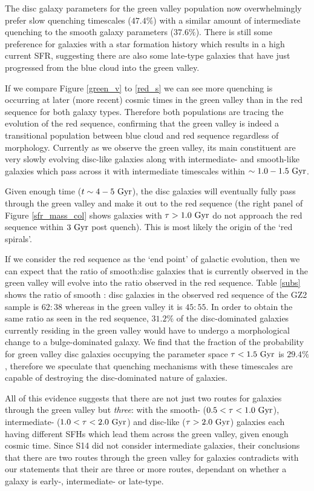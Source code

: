 \documentclass[useAMS,usenatbib]{mn2e}
\def\changed    {\color{titlecol} }
\begin{document}
{\changed The disc galaxy parameters for the green valley population now overwhelmingly prefer slow quenching timescales ($47.4\%$) with a similar amount of intermediate quenching to the smooth galaxy parameters ($37.6\%$).} There is still some preference for galaxies with a star formation history which results in a high current SFR, suggesting there are also some late-type galaxies that have just progressed from the blue cloud into the green valley. 

{\changed If we compare Figure \ref{green_v} to \ref{red_s} we can see more quenching is occurring at later (more recent) cosmic times in the green valley than in the red sequence for both galaxy types.} Therefore both populations are tracing the evolution of the red sequence, confirming that the green valley is indeed a transitional population between blue cloud and red sequence regardless of morphology. Currently as we observe the green valley, its main constituent are very slowly evolving disc-like galaxies along with intermediate- and smooth-like galaxies which pass across it with intermediate timescales within $\sim 1.0-1.5~\rm{Gyr}$.

Given enough time ($t\sim4 - 5~\rm{Gyr}$), the disc galaxies will eventually fully pass through the green valley and make it out to the red sequence (the right panel of Figure \ref{sfr_mass_col} shows galaxies with $\tau > 1.0~\rm{Gyr}$ do not approach the red sequence within $3~\rm{Gyr}$ post quench). This is most likely the origin of the `red spirals'.

{\changed If we consider the red sequence as the `end point' of galactic evolution, then we can expect that the ratio of smooth:disc galaxies that is currently observed in the green valley will evolve into the ratio observed in the red sequence. Table \ref{subs} shows the ratio of smooth : disc galaxies in the observed red sequence of the GZ2 sample is $62:38$ whereas in the green valley it is $45:55$. In order to obtain the same ratio as seen in the red sequence, $31.2\%$ of the disc-dominated galaxies currently residing in the green valley would have to undergo a morphological change to a bulge-dominated galaxy. We find that the fraction of the probability for green valley disc galaxies occupying the parameter space $\tau < 1.5 ~\rm{Gyr}$ is $29.4\%$, therefore we speculate that quenching mechanisms with these timescales are capable of destroying the disc-dominated nature of galaxies.}

All of this evidence suggests that there are not just two routes for galaxies through the green valley but \emph{three}: with the smooth- ($0.5 < \tau < 1.0 ~\rm{Gyr}$), intermediate- ($1.0 < \tau < 2.0~\rm{Gyr}$) and disc-like ($\tau > 2.0~\rm{Gyr}$) galaxies each having different SFHs which lead them across the green valley, given enough cosmic time. Since S14 did not consider intermediate galaxies, their conclusions that there are two routes through the green valley for galaxies contradicts with our statements that their are three or more routes, dependant on whether a galaxy is early-, intermediate- or late-type. 
\end{document}
